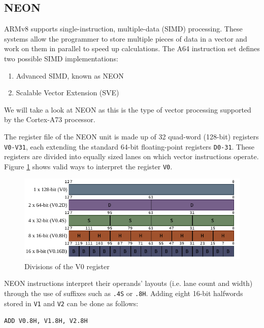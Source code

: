 \subsection{NEON}
\label{ss:neon}

ARMv8 supports single-instruction, multiple-data (SIMD) processing. These systems
allow the programmer to store multiple pieces of data in a vector and work on
them in parallel to speed up calculations. The A64 instruction set defines two
possible SIMD implementations:

\begin{enumerate}
    \item Advanced SIMD, known as NEON
    \item Scalable Vector Extension (SVE)
\end{enumerate}

We will take a look at NEON as this is the type of vector processing supported
by the Cortex-A73 processor.

The register file of the NEON unit is made up of 32 quad-word (128-bit)
registers \texttt{V0-V31}, each extending the standard 64-bit floating-point
registers \mbox{\texttt{D0-31}}. These registers are divided into equally sized
lanes on which vector instructions operate. Figure \ref{fig:regdivs} shows
valid ways to interpret the register \texttt{V0}.

\begin{figure}[h!]
    \centering
    \includegraphics[width=\textwidth]{Figures/V_register.pdf}
    \caption{Divisions of the V0 register}
    \label{fig:regdivs}
\end{figure}

NEON instructions interpret their operands' layouts (i.e. lane count and width)
through the use of suffixes such as \texttt{.4S} or \texttt{.8H}. Adding eight
16-bit halfwords stored in \texttt{V1} and \texttt{V2} can be done as follows:

\begin{center}
    \texttt{ADD V0.8H, V1.8H, V2.8H}
\end{center}

